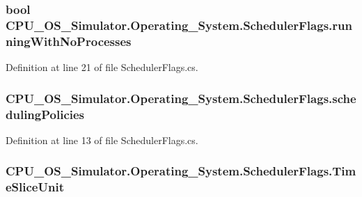 \subsubsection[{running\+With\+No\+Processes}]{\setlength{\rightskip}{0pt plus 5cm}bool C\+P\+U\+\_\+\+O\+S\+\_\+\+Simulator.\+Operating\+\_\+\+System.\+Scheduler\+Flags.\+running\+With\+No\+Processes}\label{struct_c_p_u___o_s___simulator_1_1_operating___system_1_1_scheduler_flags_a1a46dce1e8818f1dae579c00eed21ad1}


Definition at line 21 of file Scheduler\+Flags.\+cs.

\hypertarget{struct_c_p_u___o_s___simulator_1_1_operating___system_1_1_scheduler_flags_a2461410563876df6082b78db986c6bf1}{}
\subsubsection[{scheduling\+Policies}]{ C\+P\+U\+\_\+\+O\+S\+\_\+\+Simulator.\+Operating\+\_\+\+System.\+Scheduler\+Flags.\+scheduling\+Policies}\label{struct_c_p_u___o_s___simulator_1_1_operating___system_1_1_scheduler_flags_a2461410563876df6082b78db986c6bf1}


Definition at line 13 of file Scheduler\+Flags.\+cs.

\hypertarget{struct_c_p_u___o_s___simulator_1_1_operating___system_1_1_scheduler_flags_af668afafedff1a596fff642d2fcd38b7}{}
\subsubsection[{Time\+Slice\+Unit}]{ C\+P\+U\+\_\+\+O\+S\+\_\+\+Simulator.\+Operating\+\_\+\+System.\+Scheduler\+Flags.\+Time\+Slice\+Unit}\label{struct_c_p_u___o_s___simulator_1_1_operating___system_1_1_scheduler_flags_af668afafedff1a596fff642d2fcd38b7}


